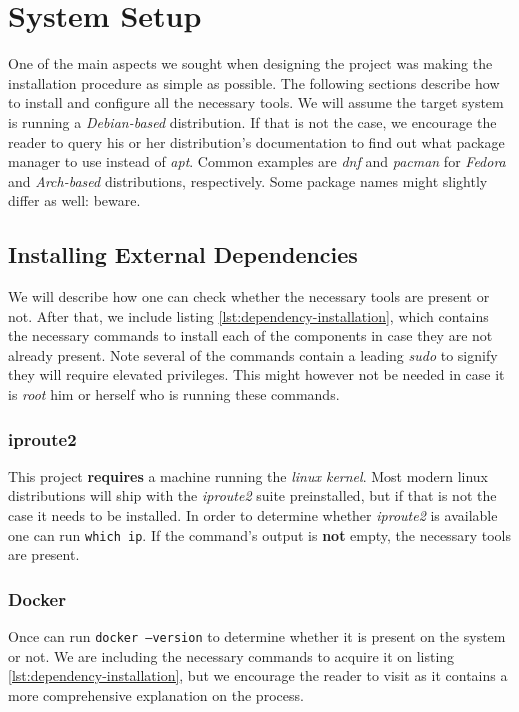 \chapter{System Setup}
    One of the main aspects we sought when designing the project was making the installation procedure as simple as possible. The following sections describe how to install and configure all the necessary tools. We will assume the target system is running a \textit{Debian-based} distribution. If that is not the case, we encourage the reader to query his or her distribution's documentation to find out what package manager to use instead of \textit{apt}. Common examples are \textit{dnf} and \textit{pacman} for \textit{Fedora} and \textit{Arch-based} distributions, respectively. Some package names might slightly differ as well: beware.\\

    \section{Installing External Dependencies}
        We will describe how one can check whether the necessary tools are present or not. After that, we include listing \ref{lst:dependency-installation}, which contains the necessary commands to install each of the components in case they are not already present. Note several of the commands contain a leading \textit{sudo} to signify they will require elevated privileges. This might however not be needed in case it is \textit{root} him or herself who is running these commands.\\

        \subsection{iproute2}
            This project \textbf{requires} a machine running the \textit{linux kernel}. Most modern linux distributions will ship with the \textit{iproute2} suite preinstalled, but if that is not the case it needs to be installed. In order to determine whether \textit{iproute2} is available one can run \texttt{which ip}. If the command's output is \textbf{not} empty, the necessary tools are present.\\

        \subsection{Docker}
            Once can run \texttt{docker --version} to determine whether it is present on the system or not. We are including the necessary commands to acquire it on listing \ref{lst:dependency-installation}, but we encourage the reader to visit \cite{bib:docker-install} as it contains a more comprehensive explanation on the process.\\

